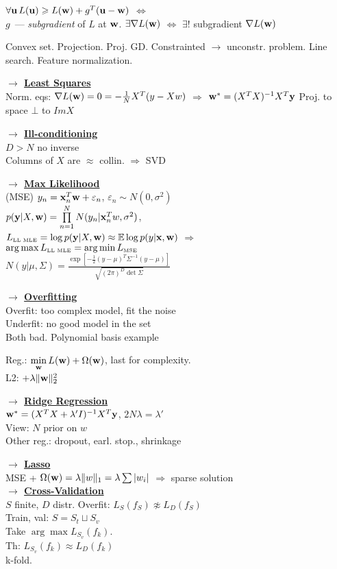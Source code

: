 \documentclass[11pt]{article}
\newcommand{\myvector}[1]{{\bf{#1}}}
\newcommand{\x}{\myvector{x}}
\newcommand{\y}{\myvector{y}}
\newcommand{\w}{\myvector{w}}
\newcommand{\uu}{\myvector{u}}
\newcommand{\mytitle}[1]{ {\bf $\rightarrow$ \underline{#1}}\\}
\begin{document}
\begin{multicols*}{2}
$\forall\uu\,L(\uu)\geqslant L(\w)+g^T(\uu-\w)$ $\Leftrightarrow$\\
$g$~--- {\em subgradient} of $L$ at $\w$. $\exists \nabla L(\w)$ $\Leftrightarrow$
$\exists!$ subgradient $\nabla L(\w)$

Convex set. Projection. Proj. GD. Constrainted $\rightarrow$ unconstr. problem. Line search. Feature normalization. 

\mytitle{Least Squares}
Norm. eqs: $\nabla L(\w)=0=-\frac{1}{N}X^T(y-Xw)$
$\Rightarrow$ $\w^*=(X^TX)^{-1}X^T\myvector{y}$
Proj. to space $\bot$ to $ImX$

\mytitle{Ill-conditioning}
$D>N$ no inverse\\
Columns of $X$ are $\approx$ collin. $\Rightarrow$ SVD

\mytitle{Max Likelihood}
(MSE) $y_n=\x_n^T\w+\varepsilon_n$, $\varepsilon_n\sim N(0, \sigma^2)$\\
$p(\y|X,\w)=\prod\limits_{n=1}^NN(y_n|\x_n^Tw,\sigma^2)$,\\
$L_{\mbox{\tiny LL MLE}}=\log p(\y|X,\w)\approx \mathbb{E}\log p(y|\x,\w)$ $\Rightarrow$\\
$\arg\max L_{\mbox{\tiny LL MLE}}=\arg\min L_{\mbox{\tiny MSE}}$\\
$N(y|\mu,\Sigma)=\frac{\exp\left[-\frac{1}{2}(y-\mu)^T\Sigma^{-1}(y-\mu)\right]}{\sqrt{(2\pi)^D\det\Sigma}}$

\mytitle{Overfitting}
Overfit: too complex model, fit the noise\\
Underfit: no good model in the set\\
Both bad. Polynomial basis example

Reg.: $\min\limits_\w L(\w)+\Omega(\w)$, last for complexity.\\
L2: $+\lambda \|\w\|_2^2$

\mytitle{Ridge Regression}
$\w^*=(X^TX+\lambda'I)^{-1}X^T\y$, $2N\lambda=\lambda'$\\
View: $N$ prior on $w$\\
Other reg.: dropout, earl. stop., shrinkage

\mytitle{Lasso}
MSE + $\Omega(\w)=\lambda \|w\|_1=\lambda\sum |w_i|$ $\Rightarrow$ sparse solution\\

\mytitle{Cross-Validation}
$S$ finite, $D$ distr.
Overfit: $L_S(f_S)\not\approx L_D(f_S)$\\
Train, val: $S=S_t\sqcup S_v$\\
Take $\arg\max L_{S_v}(f_k)$.\\
Th: $L_{S_v}(f_k)\approx L_D(f_k)$\\
k-fold.


\end{multicols*}
\end{document}
